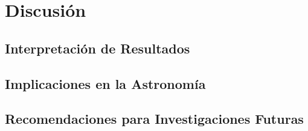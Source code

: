 \documentclass[../Main.tex]{subfiles}
\begin{document}
\section{Discusión}

\subsection{Interpretación de Resultados}
\lipsum[1] %

\subsection{Implicaciones en la Astronomía}
\lipsum[2] %

\subsection{Recomendaciones para Investigaciones Futuras}
\lipsum[3] %

\biblio
\end{document}
